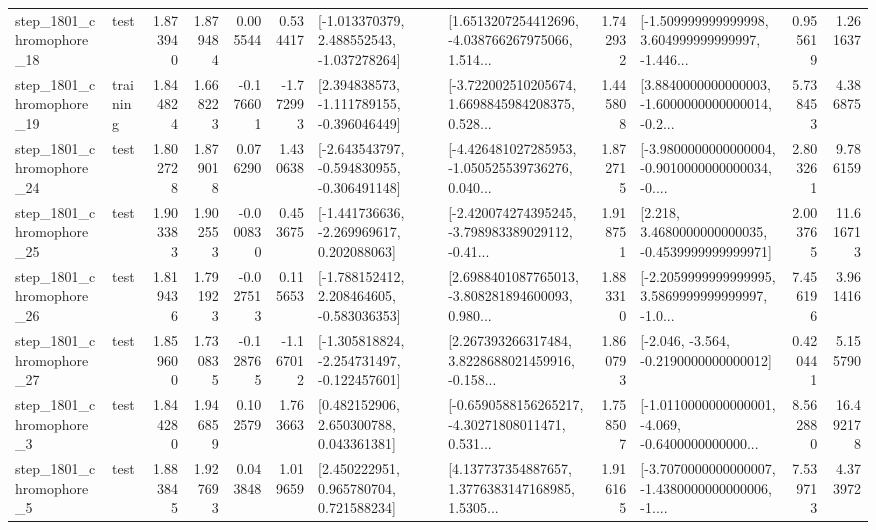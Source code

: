 \begin{tabular}{llrrrrllrlrr}
 step\_1801\_chromophore\_18 &      test &      1.873940 &    1.879484 &      0.005544 &  0.534417 &   [-1.013370379, 2.488552543, -1.037278264] &  [1.6513207254412696, -4.038766267975066, 1.514... &       1.742932 &  [-1.509999999999998, 3.604999999999997, -1.446... &            0.955619 &          1.261637 \\
 step\_1801\_chromophore\_19 &  training &      1.844824 &    1.668223 &     -0.176601 & -1.772993 &   [2.394838573, -1.111789155, -0.396046449] &  [-3.722002510205674, 1.6698845984208375, 0.528... &       1.445808 &  [3.8840000000000003, -1.6000000000000014, -0.2... &            5.738453 &          4.386875 \\
 step\_1801\_chromophore\_24 &      test &      1.802728 &    1.879018 &      0.076290 &  1.430638 &  [-2.643543797, -0.594830955, -0.306491148] &  [-4.426481027285953, -1.050525539736276, 0.040... &       1.872715 &  [-3.9800000000000004, -0.9010000000000034, -0.... &            2.803261 &          9.786159 \\
 step\_1801\_chromophore\_25 &      test &      1.903383 &    1.902553 &     -0.000830 &  0.453675 &   [-1.441736636, -2.269969617, 0.202088063] &  [-2.420074274395245, -3.798983389029112, -0.41... &       1.918751 &   [2.218, 3.4680000000000035, -0.4539999999999971] &            2.003765 &         11.616713 \\
 step\_1801\_chromophore\_26 &      test &      1.819436 &    1.791923 &     -0.027513 &  0.115653 &   [-1.788152412, 2.208464605, -0.583036353] &  [2.6988401087765013, -3.808281894600093, 0.980... &       1.883310 &  [-2.2059999999999995, 3.5869999999999997, -1.0... &            7.456196 &          3.961416 \\
 step\_1801\_chromophore\_27 &      test &      1.859600 &    1.730835 &     -0.128765 & -1.167012 &  [-1.305818824, -2.254731497, -0.122457601] &  [2.267393266317484, 3.8228688021459916, -0.158... &       1.860793 &              [-2.046, -3.564, -0.2190000000000012] &            0.420441 &          5.155790 \\
  step\_1801\_chromophore\_3 &      test &      1.844280 &    1.946859 &      0.102579 &  1.763663 &     [0.482152906, 2.650300788, 0.043361381] &  [-0.6590588156265217, -4.30271808011471, 0.531... &       1.758507 &  [-1.0110000000000001, -4.069, -0.6400000000000... &            8.562880 &         16.492178 \\
  step\_1801\_chromophore\_5 &      test &      1.883845 &    1.927693 &      0.043848 &  1.019659 &     [2.450222951, 0.965780704, 0.721588234] &  [4.137737354887657, 1.3776383147168985, 1.5305... &       1.916165 &  [-3.7070000000000007, -1.4380000000000006, -1.... &            7.539713 &          4.373972 \\

\end{tabular}
